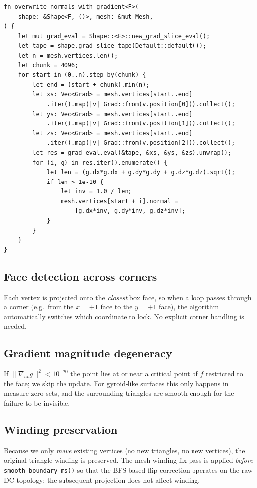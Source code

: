 \documentclass[11pt]{article}
\begin{document}
\begin{lstlisting}
fn overwrite_normals_with_gradient<F>(
    shape: &Shape<F, ()>, mesh: &mut Mesh,
) {
    let mut grad_eval = Shape::<F>::new_grad_slice_eval();
    let tape = shape.grad_slice_tape(Default::default());
    let n = mesh.vertices.len();
    let chunk = 4096;
    for start in (0..n).step_by(chunk) {
        let end = (start + chunk).min(n);
        let xs: Vec<Grad> = mesh.vertices[start..end]
            .iter().map(|v| Grad::from(v.position[0])).collect();
        let ys: Vec<Grad> = mesh.vertices[start..end]
            .iter().map(|v| Grad::from(v.position[1])).collect();
        let zs: Vec<Grad> = mesh.vertices[start..end]
            .iter().map(|v| Grad::from(v.position[2])).collect();
        let res = grad_eval.eval(&tape, &xs, &ys, &zs).unwrap();
        for (i, g) in res.iter().enumerate() {
            let len = (g.dx*g.dx + g.dy*g.dy + g.dz*g.dz).sqrt();
            if len > 1e-10 {
                let inv = 1.0 / len;
                mesh.vertices[start + i].normal =
                    [g.dx*inv, g.dy*inv, g.dz*inv];
            }
        }
    }
}
\end{lstlisting}

\subsection{Face detection across corners}

Each vertex is projected onto the \emph{closest} box face, so when a loop
passes through a corner (e.g.\ from the $x=+1$ face to the $y=+1$ face),
the algorithm automatically switches which coordinate to lock.  No
explicit corner handling is needed.

\subsection{Gradient magnitude degeneracy}

If $\|\nabla_{uv} g\|^2 < 10^{-20}$ the point lies at or near a critical
point of $f$ restricted to the face; we skip the update.  For
gyroid-like surfaces this only happens in measure-zero sets, and the
surrounding triangles are smooth enough for the failure to be invisible.

\subsection{Winding preservation}

Because we only \emph{move} existing vertices (no new triangles, no new
vertices), the original triangle winding is preserved.  The mesh-winding
fix pass is applied \emph{before} \texttt{smooth\_boundary\_ms()} so that
the BFS-based flip correction operates on the raw DC topology; the
subsequent projection does not affect winding.
\end{document}
